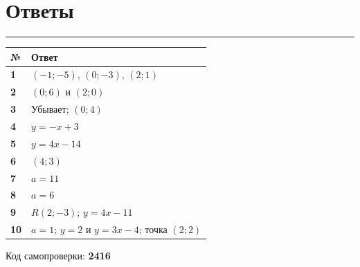 \documentclass[a4paper,12pt]{article}
\newcommand{\sectionline}{\par\vspace{2pt}\textcolor{accent}{\rule{\linewidth}{0.8pt}}\vspace{5pt}}
\begin{document}
\clearpage
\section*{Ответы}
\sectionline

\renewcommand{\arraystretch}{1.45}
\begin{longtable}{@{}>{\bfseries}p{12mm}p{\dimexpr\linewidth-18mm\relax}@{}}
\toprule
№ & Ответ \\
\midrule
\endhead
1 & $(-1;-5)$, $(0;-3)$, $(2;1)$ \\
2 & $(0;6)$ и $(2;0)$ \\
3 & Убывает; $(0;4)$ \\
4 & $y=-x+3$ \\
5 & $y=4x-14$ \\
6 & $(4;3)$ \\
7 & $a=11$ \\
8 & $a=6$ \\
9 & $R(2;-3)$; $y=4x-11$ \\
10 & $a=1$; $y=2$ и $y=3x-4$; точка $(2;2)$ \\
\bottomrule
\end{longtable}

\vfill
\begin{center}
  \textcolor{softgray}{Код самопроверки: \textbf{2416}}
\end{center}
\end{document}
